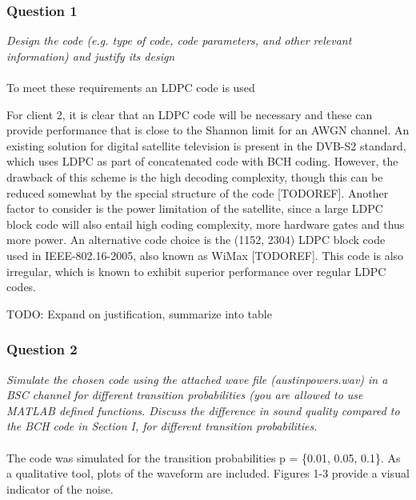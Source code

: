 \documentclass[a4paper]{article}
\begin{document}
\subsubsection{Question 1} \textit{Design the code (e.g. type of code, code parameters, and other relevant information) and justify its design}\\
\\

To meet these requirements an LDPC code is used

For client 2, it is clear that an LDPC code will be necessary and these can provide performance that is close to the Shannon limit for an AWGN channel. 
An existing solution for digital satellite television is present in the DVB-S2
standard, which uses LDPC as part of concatenated code with BCH coding\cite{morello2006dvb}. However,
the drawback of this scheme is the high decoding complexity, though this can be 
reduced somewhat by the special structure of the code [TODOREF]. Another factor to consider is the power limitation of the satellite, since a large LDPC block code will also entail high coding complexity, more hardware gates and thus more power. An alternative code choice
is the (1152, 2304) LDPC block code used in IEEE-802.16-2005, also known as WiMax [TODOREF]. This code is also irregular, which is known to exhibit superior performance over regular LDPC codes.

TODO: Expand on justification, summarize into table

\subsubsection{Question 2} \textit{Simulate the chosen code using the attached wave file (austinpowers.wav) in a BSC channel for different transition probabilities (you are allowed to use MATLAB defined functions. Discuss the difference in sound quality compared to the BCH code in Section I, for different transition probabilities.}\\
\\


The code was simulated for the transition probabilities p = \{0.01, 0.05, 0.1\}. As a qualitative tool, plots of the waveform are included. Figures 1-3 provide a visual indicator of the noise. \\
\end{document}
